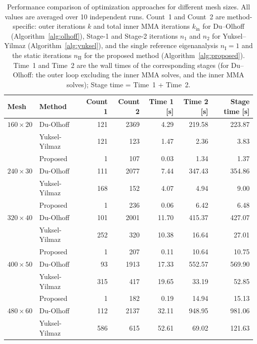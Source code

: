 \documentclass[pdflatex,lineno,sn-mathphys-ay]{sn-jnl}
\begin{document}
\begin{table}[t]
\centering
\caption{Performance comparison of optimization approaches for different mesh sizes. All values are averaged over 10 independent runs. Count~1 and Count~2 are method-specific: outer iterations $k$ and total inner MMA iterations $k_{\mathrm{in}}$ for Du--Olhoff (Algorithm~\ref{alg:olhoff}), Stage-1 and Stage-2 iterations $n_1$ and $n_2$ for Yuksel--Yilmaz (Algorithm~\ref{alg:yuksel}), and the single reference eigenanalysis $n_{\mathrm{I}} = 1$ and the static iterations $n_{\mathrm{II}}$ for the proposed method (Algorithm~\ref{alg:proposed}). Time~1 and Time~2 are the wall times of the corresponding stages (for Du--Olhoff: the outer loop excluding the inner MMA solves, and the inner MMA solves); Stage time = Time~1 + Time~2.}
\begingroup
\setlength{\tabcolsep}{3pt}
\renewcommand{\arraystretch}{1.3}
\scriptsize
\providecommand{\thinhline}{\noalign{\global\setlength{\arrayrulewidth}{0.2pt}}\hline\noalign{\global\setlength{\arrayrulewidth}{0.4pt}}}
\begin{tabular}{llrrrrr}
\hline
Mesh & Method & Count 1 & Count 2 & Time 1 [s] & Time 2 [s] & Stage time [s] \\
\hline
$160\times20$ & Du-Olhoff & 121 & 2369 & 4.29 & 219.58 & 223.87 \\
 & Yuksel-Yilmaz & 121 & 123 & 1.47 & 2.36 & 3.83 \\
 & Proposed & 1 & 107 & 0.03 & 1.34 & 1.37 \\
\thinhline
$240\times30$ & Du-Olhoff & 111 & 2077 & 7.44 & 347.43 & 354.86 \\
 & Yuksel-Yilmaz & 168 & 152 & 4.07 & 4.94 & 9.00 \\
 & Proposed & 1 & 236 & 0.06 & 6.42 & 6.48 \\
\thinhline
$320\times40$ & Du-Olhoff & 101 & 2001 & 11.70 & 415.37 & 427.07 \\
 & Yuksel-Yilmaz & 252 & 320 & 10.38 & 16.64 & 27.01 \\
 & Proposed & 1 & 207 & 0.11 & 10.64 & 10.75 \\
\thinhline
$400\times50$ & Du-Olhoff & 93 & 1913 & 17.33 & 552.57 & 569.90 \\
 & Yuksel-Yilmaz & 315 & 417 & 19.65 & 33.19 & 52.85 \\
 & Proposed & 1 & 182 & 0.19 & 14.94 & 15.13 \\
\thinhline
$480\times60$ & Du-Olhoff & 112 & 2137 & 32.11 & 948.95 & 981.06 \\
 & Yuksel-Yilmaz & 586 & 615 & 52.61 & 69.02 & 121.63 \\

\end{tabular}
\end{table}
\end{document}
